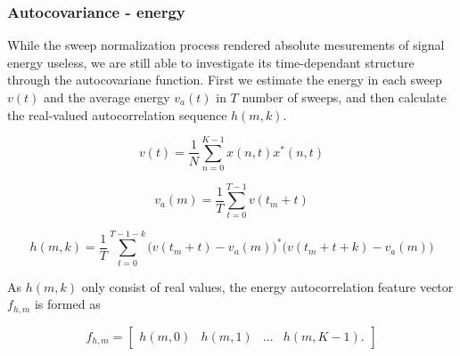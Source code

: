 \subsubsection{Autocovariance - energy}

While the sweep normalization process rendered absolute mesurements of signal energy useless, we are still able to investigate its time-dependant structure through the autocovariane function. First we estimate the energy in each sweep $v(t)$ and the average energy $v_a(t)$ in $T$ number of sweeps, and then calculate the real-valued autocorrelation sequence $h(m,k)$. 

\begin{equation}
	v(t) = \frac{1}{N}\sum_{n=0}^{K-1}x(n,t)x^*(n,t)
\end{equation}

\begin{equation} 
	v_a(m) = \frac{1}{T}\sum_{t=0}^{T-1}v(t_m+t)
\end{equation}

\begin{equation}
	h(m,k) = \frac{1}{T}\sum_{t=0}^{T-1-k}\big(v(t_m+t) - v_a(m)\big)^*\big(v(t_m+t+k) - v_a(m)\big)
\end{equation}

As $h(m,k)$ only consist of real values, the energy autocorrelation feature vector $f_{h,m}$ is formed as

\begin{equation}
	f_{h,m} = 
	\begin{bmatrix}
		h(m,0) & h(m,1) & ... & h(m,K-1).
	\end{bmatrix}
\end{equation}




